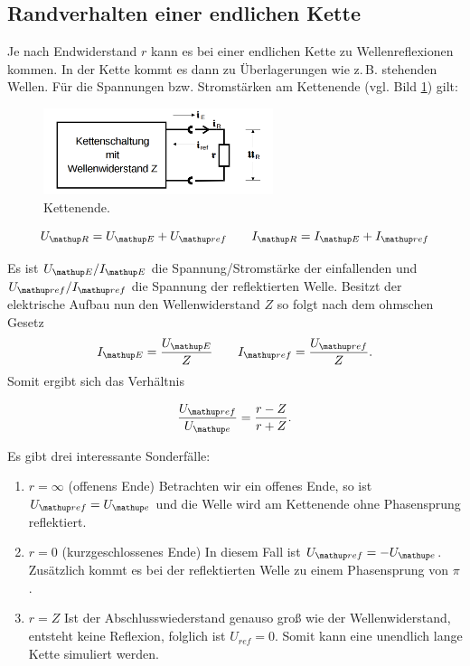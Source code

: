 \subsection{Randverhalten einer endlichen Kette}
Je nach Endwiderstand $r$ kann es bei einer endlichen Kette
zu Wellenreflexionen kommen. In der Kette kommt es dann %
zu Überlagerungen wie z.\,B. stehenden Wellen. %
Für die Spannungen bzw. Stromstärken am Kettenende (vgl. Bild \ref{fig:kettenende}) gilt:%

\begin{figure}
  \centering
  \includegraphics[width=0.6\textwidth]{bilder/wellenwiderstand.png}
  \caption{Kettenende.\cite{anleitung356}}
  \label{fig:kettenende}
\end{figure}

\begin{equation*}
U\ua{R}=U\ua{E}+U\ua{ref} \qquad I\ua{R}=I\ua{E}+I\ua{ref}
\end{equation*}

Es ist $U\ua{E}/I\ua{E}$ die Spannung/Stromstärke der einfallenden und $U\ua{ref}/I\ua{ref}$ die Spannung der reflektierten
Welle. Besitzt der elektrische Aufbau nun den Wellenwiderstand $Z$ so folgt nach dem
ohmschen Gesetz
\begin{equation*}
I\ua{E}=\frac{U\ua{E}}{Z} \qquad I\ua{ref}=\frac{U\ua{ref}}{Z}.
\end{equation*}
Somit ergibt sich das Verhältnis

\begin{equation*}
\frac{U\ua{ref}}{U\ua{e}}=\frac{r-Z}{r+Z}.
\end{equation*}

Es gibt drei interessante Sonderfälle:

\renewcommand{\labelenumi}{\alph{enumi})}
\begin{enumerate}
\item{ $r=\infty$ (offenens Ende) \newline
Betrachten wir ein offenes Ende, so ist $U\ua{ref}=U\ua{e}$ und die Welle wird am Kettenende ohne Phasensprung reflektiert.} %
\item{ $r=0$ (kurzgeschlossenes Ende) \newline
In diesem Fall ist $U\ua{ref}=-U\ua{e}$. Zusätzlich kommt es bei der reflektierten Welle zu einem Phasensprung von $\pi$.} %
\item{ $r=Z$ \newline
Ist der Abschlusswiederstand genauso groß wie der Wellenwiderstand, entsteht keine Reflexion, folglich
ist $U_{ref}=0$. Somit kann eine unendlich lange Kette simuliert werden.}
\end{enumerate}

